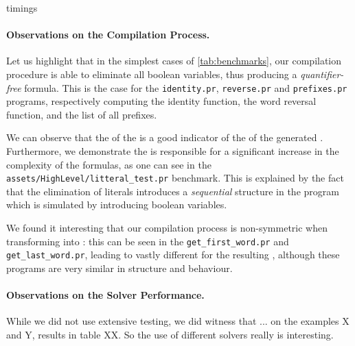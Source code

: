 \begin{table}
    \caption{timings}
    \label{tab:timings}
    \centering
    
\end{table}

\paragraph{Observations on the Compilation Process.} Let us highlight that in
the simplest cases of
\cref{tab:benchmarks},
our compilation procedure is able to eliminate all boolean variables, thus
producing a \emph{quantifier-free} formula. This is the case for the
\texttt{identity.pr}, \texttt{reverse.pr} and \texttt{prefixes.pr} programs,
respectively computing the identity function, the word reversal function, and
the list of all prefixes.

We can observe that the  of the  is a
good indicator of the  of the generated . Furthermore, we demonstrate the 
is responsible for a significant increase in the complexity of the formulas, as
one can see in the \texttt{assets/HighLevel/litteral\_test.pr} benchmark. This
is explained by the fact that the elimination of literals introduces a
\emph{sequential} structure in the program which is simulated by introducing
boolean variables.

We found it interesting that our compilation process is non-symmetric when
transforming  into : this
can be seen in the \texttt{get\_first\_word.pr} and
\texttt{get\_last\_word.pr}, leading to vastly different 
for the resulting , although these programs are
very similar in structure and behaviour.


\paragraph{Observations on the Solver Performance.} While we did not use
extensive testing, we did witness that ... on the examples X and Y, results in
table XX. So the use of different solvers really is interesting.


